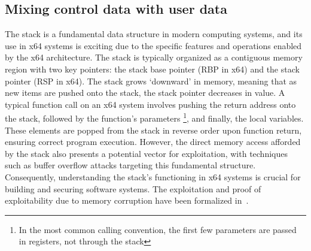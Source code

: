 \documentclass{article}
\begin{document}
\subsection{Mixing control data with user data}
The stack is a fundamental data structure in modern computing systems, and its use in x64 systems is exciting due to the specific features and operations enabled by the x64 architecture. The stack is typically organized as a contiguous memory region with two key pointers: the stack base pointer (RBP in x64) and the stack pointer (RSP in x64). The stack grows `downward' in memory, meaning that as new items are pushed onto the stack, the stack pointer decreases in value. A typical function call on an x64 system involves pushing the return address onto the stack, followed by the function's parameters \footnote{In the most common calling convention, the first few parameters are passed in registers, not through the stack}, and finally, the local variables. These elements are popped from the stack in reverse order upon function return, ensuring correct program execution. However, the direct memory access afforded by the stack also presents a potential vector for exploitation, with techniques such as buffer overflow attacks targeting this fundamental structure. Consequently, understanding the stack's functioning in x64 systems is crucial for building and securing software systems. The exploitation and proof of exploitability due to memory corruption have been formalized in~\cite{WeirdMachines}.
\end{document}

